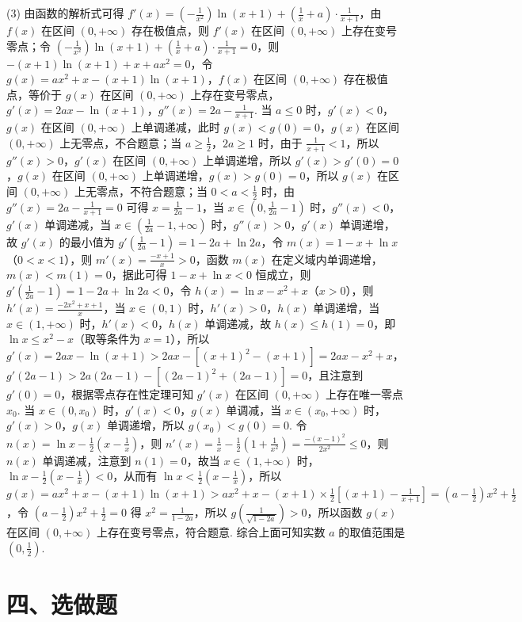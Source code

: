 \begin{question}[points=12]
\begin{solution}
(3) 由函数的解析式可得 $f'(x)=(-\frac{1}{x^2})\ln(x+1)+(\frac{1}{x}+a)\cdot\frac{1}{x+1}$，由 $f(x)$ 在区间 $(0,+\infty)$ 存在极值点，则 $f'(x)$ 在区间 $(0,+\infty)$ 上存在变号零点；令 $(-\frac{1}{x^2})\ln(x+1)+(\frac{1}{x}+a)\cdot\frac{1}{x+1}=0$，则 $-(x+1)\ln(x+1)+x+ax^2=0$，令 $g(x)=ax^2+x-(x+1)\ln(x+1)$，$f(x)$ 在区间 $(0,+\infty)$ 存在极值点，等价于 $g(x)$ 在区间 $(0,+\infty)$ 上存在变号零点，$g'(x)=2ax-\ln(x+1)$，$g''(x)=2a-\frac{1}{x+1}$. 当 $a\le0$ 时，$g'(x)<0$，$g(x)$ 在区间 $(0,+\infty)$ 上单调递减，此时 $g(x)<g(0)=0$，$g(x)$ 在区间 $(0,+\infty)$ 上无零点，不合题意；当 $a\ge\frac{1}{2}$，$2a\ge1$ 时，由于 $\frac{1}{x+1}<1$，所以 $g''(x)>0$，$g'(x)$ 在区间 $(0,+\infty)$ 上单调递增，所以 $g'(x)>g'(0)=0$，$g(x)$ 在区间 $(0,+\infty)$ 上单调递增，$g(x)>g(0)=0$，所以 $g(x)$ 在区间 $(0,+\infty)$ 上无零点，不符合题意；当 $0<a<\frac{1}{2}$ 时，由 $g''(x)=2a-\frac{1}{x+1}=0$ 可得 $x=\frac{1}{2a}-1$，当 $x\in(0,\frac{1}{2a}-1)$ 时，$g''(x)<0$，$g'(x)$ 单调递减，当 $x\in(\frac{1}{2a}-1,+\infty)$ 时，$g''(x)>0$，$g'(x)$ 单调递增，故 $g'(x)$ 的最小值为 $g'(\frac{1}{2a}-1)=1-2a+\ln2a$，令 $m(x)=1-x+\ln x$（$0<x<1$），则 $m'(x)=\frac{-x+1}{x}>0$，函数 $m(x)$ 在定义域内单调递增，$m(x)<m(1)=0$，据此可得 $1-x+\ln x<0$ 恒成立，则 $g'(\frac{1}{2a}-1)=1-2a+\ln2a<0$，令 $h(x)=\ln x-x^2+x$（$x>0$），则 $h'(x)=\frac{-2x^2+x+1}{x}$，当 $x\in(0,1)$ 时，$h'(x)>0$，$h(x)$ 单调递增，当 $x\in(1,+\infty)$ 时，$h'(x)<0$，$h(x)$ 单调递减，故 $h(x)\le h(1)=0$，即 $\ln x\le x^2-x$（取等条件为 $x=1$），所以 $g'(x)=2ax-\ln(x+1)>2ax-[(x+1)^2-(x+1)]=2ax-x^2+x$，$g'(2a-1)>2a(2a-1)-[(2a-1)^2+(2a-1)]=0$，且注意到 $g'(0)=0$，根据零点存在性定理可知 $g'(x)$ 在区间 $(0,+\infty)$ 上存在唯一零点 $x_0$. 当 $x\in(0,x_0)$ 时，$g'(x)<0$，$g(x)$ 单调减，当 $x\in(x_0,+\infty)$ 时，$g'(x)>0$，$g(x)$ 单调递增，所以 $g(x_0)<g(0)=0$. 令 $n(x)=\ln x-\frac{1}{2}(x-\frac{1}{x})$，则 $n'(x)=\frac{1}{x}-\frac{1}{2}(1+\frac{1}{x^2})=\frac{-(x-1)^2}{2x^2}\le0$，则 $n(x)$ 单调递减，注意到 $n(1)=0$，故当 $x\in(1,+\infty)$ 时，$\ln x-\frac{1}{2}(x-\frac{1}{x})<0$，从而有 $\ln x<\frac{1}{2}(x-\frac{1}{x})$，所以 $g(x)=ax^2+x-(x+1)\ln(x+1)>ax^2+x-(x+1)\times\frac{1}{2}[(x+1)-\frac{1}{x+1}]=(a-\frac{1}{2})x^2+\frac{1}{2}$，令 $(a-\frac{1}{2})x^2+\frac{1}{2}=0$ 得 $x^2=\frac{1}{1-2a}$，所以 $g(\frac{1}{\sqrt{1-2a}})>0$，所以函数 $g(x)$ 在区间 $(0,+\infty)$ 上存在变号零点，符合题意. 综合上面可知实数 $a$ 的取值范围是 $(0,\frac{1}{2})$.
\end{solution}
\end{question}

\section*{四、选做题}

